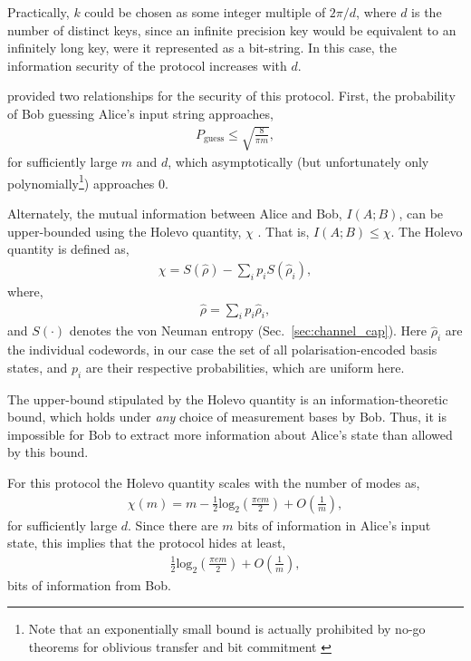 \documentclass[aps, rmp, twocolumn, amsmath, amssymb, nofootinbib, superscriptaddress, longbibliography, floatfix, table-of-contents, eqsecnum]{revtex4-1}
\begin{document}
Practically, $k$ could be chosen as some integer multiple of \mbox{$2\pi/d$}, where $d$ is the number of distinct keys, since an infinite precision key would be equivalent to an infinitely long key, were it represented as a bit-string. In this case, the information security of the protocol increases with $d$.

\cite{bib:RohdeQWEnc12} provided two relationships for the security of this protocol. First, the probability of Bob guessing Alice's input string approaches,
\begin{align}
P_\text{guess} \leq \sqrt{\frac{8}{\pi m}},
\end{align}
for sufficiently large $m$ and $d$, which asymptotically (but unfortunately only polynomially\footnote{Note that an exponentially small bound is actually prohibited by no-go theorems for oblivious transfer and bit commitment \cite{bib:HKLo97, bib:SpekkensRudolphSecure}}) approaches 0.

Alternately, the mutual information between Alice and Bob, \mbox{$I(A;B)$}, can be upper-bounded using the Holevo quantity, $\chi$ \cite{HolevoQuantity}. That is, \mbox{$I(A;B)\leq\chi$}. The Holevo quantity is defined as,
\begin{align}
\chi = S(\hat\rho) - \sum_i p_i S(\hat\rho_i),
\end{align}
where,
\begin{align}
\hat\rho = \sum_i p_i \hat\rho_i,
\end{align}
and $S(\cdot)$ denotes the von Neuman entropy (Sec.~\ref{sec:channel_cap}). Here $\hat\rho_i$ are the individual codewords, in our case the set of all polarisation-encoded basis states, and $p_i$ are their respective probabilities, which are uniform here.

The upper-bound stipulated by the Holevo quantity is an information-theoretic bound, which holds under \textit{any} choice of measurement bases by Bob. Thus, it is impossible for Bob to extract more information about Alice's state than allowed by this bound.

For this protocol the Holevo quantity scales with the number of modes as,
\begin{align}
\chi(m) = m - \frac{1}{2}\text{log}_2\left(\frac{\pi e m}{2}\right) + O\left(\frac{1}{m}\right),
\end{align}
for sufficiently large $d$. Since there are $m$ bits of information in Alice's input state, this implies that the protocol hides at least,
\begin{align}
\frac{1}{2}\text{log}_2\left(\frac{\pi e m}{2}\right) + O\left(\frac{1}{m}\right),
\end{align}
bits of information from Bob.
\end{document}
